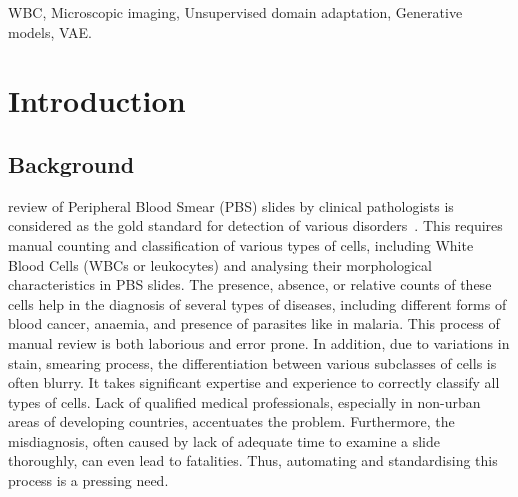 \documentclass[journal,twoside,web]{IEEEtran}
\begin{document}
\begin{IEEEkeywords} 
WBC, Microscopic imaging, Unsupervised domain adaptation, Generative models, VAE.
\end{IEEEkeywords}
\IEEEpeerreviewmaketitle
\section{Introduction}
\subsection{Background}
 review of Peripheral Blood Smear (PBS) slides by clinical pathologists is considered as the gold standard for detection of various disorders~\cite{bloodbook}. {This requires manual counting and classification of various types of cells, including White Blood Cells} (WBCs or leukocytes) and analysing their morphological characteristics in PBS slides.
The presence, absence, or relative counts of these cells help in the diagnosis of several types of diseases, including different forms of blood cancer, anaemia, and presence of parasites like in malaria.
This process of manual review is both laborious and error prone.
In addition, due to variations in stain, smearing process, the differentiation between various subclasses of cells is often blurry.
It takes significant expertise and experience to correctly classify all types of cells.
Lack of qualified medical professionals, especially in non-urban areas of developing countries, accentuates the problem.
Furthermore, the misdiagnosis, often caused by lack of adequate time to examine a slide thoroughly, can even lead to fatalities.
Thus, automating and standardising this process is a pressing need.
\end{document}
